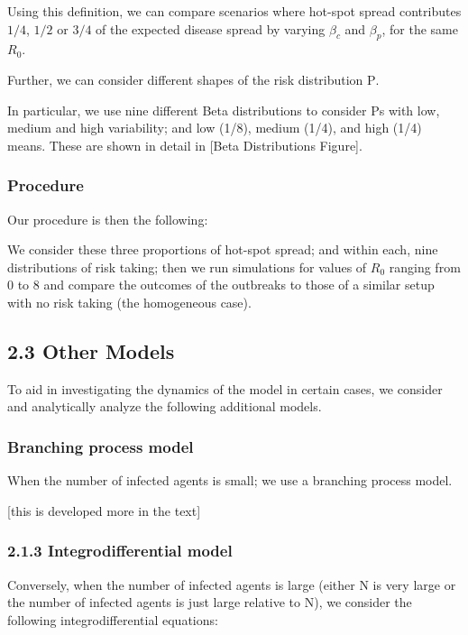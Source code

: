 Using this definition, we can compare scenarios where hot-spot spread
contributes \(1/4\), \(1/2\) or \(3/4\) of the expected disease spread
by varying \(\beta_c\) and \(\beta_p\), for the same \(R_0\).

Further, we can consider different shapes of the risk distribution
\(\mathrm{P}\).

In particular, we use nine different Beta distributions to consider
\(\mathrm{P}\)s with low, medium and high variability; and low (1/8),
medium (1/4), and high (1/4) means. These are shown in detail in {[}Beta
Distributions Figure{]}.

\subsubsection{Procedure}\label{procedure}

Our procedure is then the following:

We consider these three proportions of hot-spot spread; and within each,
nine distributions of risk taking; then we run simulations for values of
\(R_0\) ranging from 0 to 8 and compare the outcomes of the outbreaks to
those of a similar setup with no risk taking (the homogeneous case).

\subsection{2.3 Other Models}\label{other-models}

To aid in investigating the dynamics of the model in certain cases, we
consider and analytically analyze the following additional models.

\subsubsection{Branching process model}\label{branching-process-model}

When the number of infected agents is small; we use a branching process
model.

{[}this is developed more in the text{]}

\subsubsection{2.1.3 Integrodifferential
model}\label{integrodifferential-model}

Conversely, when the number of infected agents is large (either N is
very large or the number of infected agents is just large relative to
N), we consider the following integrodifferential equations:

